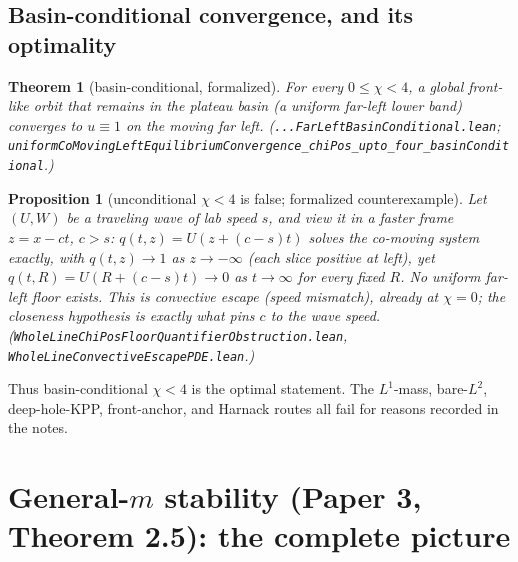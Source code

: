 \documentclass[11pt]{article}
\newtheorem{theorem}{Theorem}
\newtheorem{proposition}{Proposition}
\begin{document}
\subsection{Basin-conditional convergence, and its optimality}
\begin{theorem}[basin-conditional, formalized]
For every $0\le\chi<4$, a global front-like orbit that remains in the plateau basin (a uniform
far-left lower band) converges to $u\equiv1$ on the moving far left.
(\texttt{...FarLeftBasinConditional.lean};
\texttt{uniformCoMovingLeftEquilibriumConvergence\_chiPos\_upto\_four\_basinConditional}.)
\end{theorem}
\begin{proposition}[unconditional $\chi<4$ is false; formalized counterexample]
Let $(U,W)$ be a traveling wave of lab speed $s$, and view it in a faster frame $z=x-ct$, $c>s$:
$q(t,z)=U(z+(c-s)t)$ solves the co-moving system exactly, with $q(t,z)\to1$ as $z\to-\infty$
(each slice positive at left), yet $q(t,R)=U(R+(c-s)t)\to0$ as $t\to\infty$ for every fixed $R$.
No uniform far-left floor exists. This is \emph{convective escape} (speed mismatch), already at
$\chi=0$; the closeness hypothesis is exactly what pins $c$ to the wave speed.
(\texttt{WholeLineChiPosFloorQuantifierObstruction.lean},
\texttt{WholeLineConvectiveEscapePDE.lean}.)
\end{proposition}
Thus basin-conditional $\chi<4$ is the optimal statement. The $L^1$-mass, bare-$L^2$,
deep-hole-KPP, front-anchor, and Harnack routes all fail for reasons recorded in the notes.

\section{General-$m$ stability (Paper 3, Theorem 2.5): the complete picture}
\end{document}
